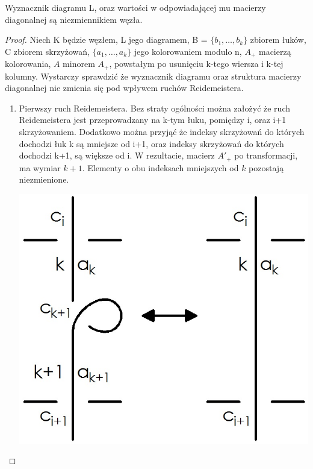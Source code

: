 \begin{twierdzenie}
Wyznacznik diagramu L, oraz wartości w odpowiadającej mu macierzy diagonalnej są niezmiennikiem węzła.
\end{twierdzenie}
\begin{proof}
Niech K będzie węzłem, L jego diagramem, B = $\lbrace b_{1}, \ldots, b_{k}\rbrace$ zbiorem łuków,  C zbiorem skrzyżowań, $\lbrace a_{1}, \ldots, a_{k}\rbrace$ jego kolorowaniem modulo n, $A_{+}$ macierzą kolorowania, $A$ minorem $A_{+}$, powstałym po usunięciu k-tego wiersza i k-tej kolumny. Wystarczy sprawdzić że wyznacznik diagramu oraz struktura macierzy diagonalnej nie zmienia się pod wpływem ruchów Reidemeistera.  
\begin{enumerate}
\item Pierwszy ruch Reidemeistera. Bez straty ogólności można założyć że ruch Reidemeistera jest przeprowadzany na k-tym łuku, pomiędzy i, oraz i+1 skrzyżowaniem. Dodatkowo można przyjąć że indeksy skrzyżowań do których dochodzi łuk k są mniejsze od i+1, oraz indeksy skrzyżowań do których dochodzi k+1, są większe od i. W rezultacie,  macierz $A'_{+}$  po transformacji, ma wymiar $k+1$. Elementy o obu indeksach mniejszych  od $k$ pozostają niezmienione.

\begin{minipage}{0.5\textwidth}
\begin{center}
			\includegraphics[scale=0.25]{2/Obrazy/R1det}
\end{center}
\end{minipage}
\begin{minipage}{0.5\textwidth}
\begin{center}


\end{center}
\end{minipage}
\end{enumerate}
\end{proof}
